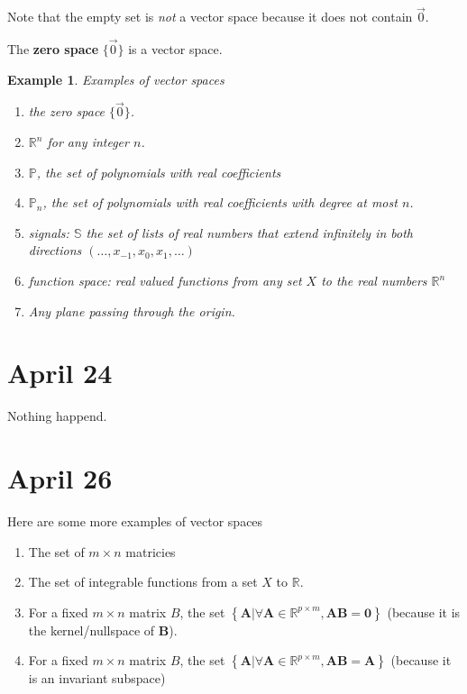 \documentclass[11pt]{article}
\newtheorem{ex}{Example}
\begin{document}
Note that the empty set is \emph{not} a vector space because it does not contain $\vec{0}$.


The \textbf{zero space} $\{\vec{0}\}$ is a vector space.

\begin{ex}
  Examples of vector spaces
  \begin{enumerate}
    \item the zero space $\{\vec{0}\}$.
    \item $\mathbb{R}^{n}$ for any integer $n$.
    \item $\mathbb{P}$, the set of polynomials with real coefficients
    \item $\mathbb{P}_{n}$, the set of polynomials with real coefficients with degree at most $n$.
    \item signals: $\mathbb{S}$ the set of lists of real numbers that extend infinitely in both directions $(\ldots, x_{-1}, x_{0}, x_{1}, \ldots)$
    \item function space: real valued functions from any set $X$ to the real numbers $\mathbb{R}^{n}$
    \item Any plane passing through the origin.
  \end{enumerate}
\end{ex}

\section{April 24}
Nothing happend.
\section{April 26}
Here are some more examples of vector spaces
\begin{enumerate}
  \item The set of $m \times n$ matricies
  \item The set of integrable functions from a set $X$ to $\mathbb{R}$.
  \item For a fixed $m \times n$ matrix $B$, the set $\left\{ \mathbf{A} | \forall \mathbf{A} \in \mathbb{R}^{p \times m} ,  \mathbf{A}\mathbf{B} = \mathbf{0}\right\}$ (because it is the kernel/nullspace of $\mathbf{B}$).
  \item For a fixed $m \times n$ matrix $B$, the set $\left\{\mathbf{A} | \forall \mathbf{A} \in \mathbb{R}^{p \times m} , \mathbf{AB} = \mathbf{A}\right\}$ (because it is an invariant subspace)
\end{enumerate}
\end{document}
